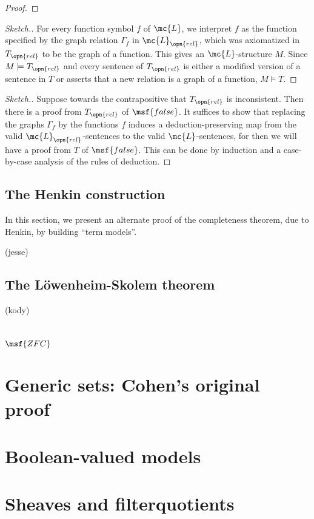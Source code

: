 \documentclass[11pt]{article}
\newcommand{\false}{\msf{false}}
\begin{document}

\begin{proof}

\end{proof}


\begin{proof}[Sketch.]
For every function symbol $f$ of $\mc{L}$, we interpret $f$ as the function specified by the graph relation $\Gamma_f$ in $\mc{L}_{\opn{rel}}$, which was axiomatized in $T_{\opn{rel}}$ to be the graph of a function. This gives an $\mc{L}$-structure $M$. Since $M \models T_{\opn{rel}}$ and every sentence of $T_{\opn{rel}}$ is either a modified version of a sentence in $T$ or asserts that a new relation is a graph of a function, $M \models T$. 
\end{proof}

\begin{proof}[Sketch.]
 Suppose towards the contrapositive that $T_{\opn{rel}}$ is inconsistent. Then there is a proof from $T_{\opn{rel}}$ of $\false$. It suffices to show that replacing the graphs $\Gamma_f$ by the functions $f$ induces a deduction-preserving map from the valid $\mc{L}_{\opn{rel}}$-sentences to the valid $\mc{L}$-sentences, for then we will have a proof from $T$ of $\false$. This can be done by induction and a case-by-case analysis of the rules of deduction.
\end{proof}

\subsection{The Henkin construction}
In this section, we present an alternate proof of the completeness theorem, due to Henkin, by building ``term models''.

(jesse)

\subsection{The L\"owenheim-Skolem theorem}
(kody)

\section{$\msf{ZFC}$}

\section{Generic sets: Cohen's original proof}


\section{Boolean-valued models}


\section{Sheaves and filterquotients}
\end{document}
